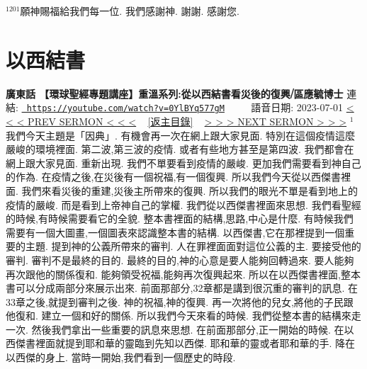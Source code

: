 \documentclass{book}
\begin{document}
$^{1201}$願神賜福給我們每一位.
我們感謝神.
謝謝.
感謝您.
\newpage



\section{以西結書}
\label{sec:0YlBYq577gM}
\textbf{廣東話 【環球聖經專題講座】重溫系列:從以西結書看災後的復興⧸區應毓博士}
\newline
\newline
連結: \href{https://youtube.com/watch?v=0YlBYq577gM}{\texttt{ https://youtube.com/watch?v=0YlBYq577gM}} ~~~~ 語音日期: 2023-07-01 
\newline
\newline
\hyperref[sec:Fxadxqj_2hA]{\small{< < < PREV SERMON < < <}}
~
\hyperref[sec:index]{\small{[返主目錄]}}
~
\hyperref[sec:m3mUgMGT_bg]{\small{> > > NEXT SERMON > > >}}
\newline
\newline
$^{1}$我們今天主題是「因典」.
有機會再一次在網上跟大家見面.
特別在這個疫情這麼嚴峻的環境裡面.
第二波,第三波的疫情.
或者有些地方甚至是第四波.
我們都會在網上跟大家見面.
重新出現.
我們不單要看到疫情的嚴峻.
更加我們需要看到神自己的作為.
在疫情之後,在災後有一個祝福,有一個復興.
所以我們今天從以西傑書裡面.
我們來看災後的重建,災後主所帶來的復興.
所以我們的眼光不單是看到地上的疫情的嚴峻.
而是看到上帝神自己的掌權.
我們從以西傑書裡面來思想.
我們看聖經的時候,有時候需要看它的全貌.
整本書裡面的結構,思路,中心是什麼.
有時候我們需要有一個大圖畫,一個圖表來認識整本書的結構.
以西傑書,它在那裡提到一個重要的主題.
提到神的公義所帶來的審判.
人在罪裡面面對這位公義的主.
要接受他的審判.
審判不是最終的目的.
最終的目的,神的心意是要人能夠回轉過來.
要人能夠再次跟他的關係復和.
能夠領受祝福,能夠再次復興起來.
所以在以西傑書裡面,整本書可以分成兩部分來展示出來.
前面那部分,32章都是講到很沉重的審判的訊息.
在33章之後,就提到審判之後.
神的祝福,神的復興.
再一次將他的兒女,將他的子民跟他復和.
建立一個和好的關係.
所以我們今天來看的時候.
我們從整本書的結構來走一次.
然後我們拿出一些重要的訊息來思想.
在前面那部分,正一開始的時候.
在以西傑書裡面就提到耶和華的靈臨到先知以西傑.
耶和華的靈或者耶和華的手.
降在以西傑的身上.
當時一開始,我們看到一個歷史的時段.
\end{document}
